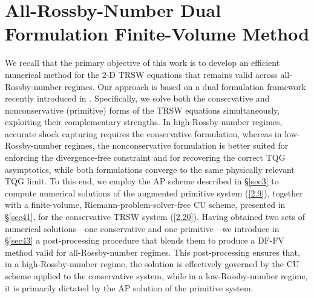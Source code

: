 \documentclass[a4paper,11pt,twoside]{article}
\numberwithin{equation}{section}
\numberwithin{figure}{section}
\numberwithin{table}{section}
\newcommand\eref[1]{(\ref{#1})}
\begin{document}
\section{All-Rossby-Number Dual Formulation Finite-Volume Method}\label{sec4}
We recall that the primary objective of this work is to develop an efficient numerical method for the 2-D TRSW equations that remains valid
across all-Rossby-number regimes. Our approach is based on a dual formulation framework recently introduced in
\cite{Abgrall_2025,CFKM,CKKM}. Specifically, we solve both the conservative and nonconservative (primitive) forms of the TRSW equations
simultaneously, exploiting their complementary strengths. In high-Rossby-number regimes, accurate shock capturing requires the conservative
formulation, whereas in low-Rossby-number regimes, the nonconservative formulation is better suited for enforcing the divergence-free
constraint and for recovering the correct TQG asymptotics, while both formulations converge to the same physically relevant TQG limit. To
this end, we employ the AP scheme described in \S\ref{sec3} to compute numerical solutions of the augmented primitive system \eref{2.9},
together with a finite-volume, Riemann-problem-solver-free CU scheme, presented in \S\ref{sec41}, for the conservative TRSW system
\eref{2.20}. Having obtained two sets of numerical solutions---one conservative and one primitive---we introduce in \S\ref{sec43} a
post-processing procedure that blends them to produce a DF-FV method valid for all-Rossby-number regimes. This post-processing ensures that,
in a high-Rossby-number regime, the solution is effectively governed by the CU scheme applied to the conservative system, while in a
low-Rossby-number regime, it is primarily dictated by the AP solution of the primitive system.

\end{document}
